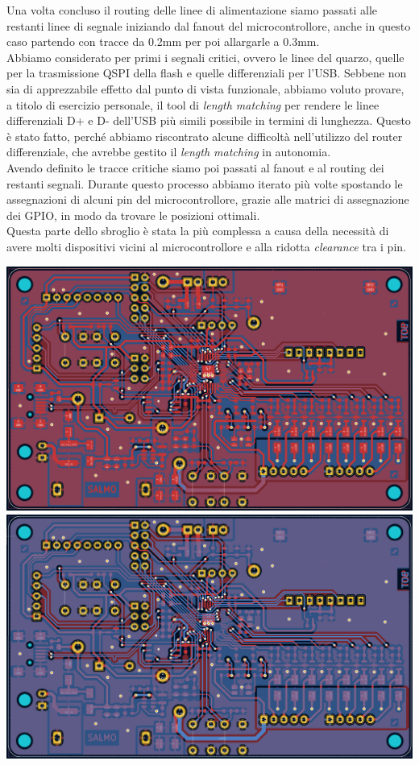 \noindent Una volta concluso il routing delle linee di alimentazione siamo passati
alle restanti linee di segnale iniziando dal fanout del
microcontrollore, anche in questo caso partendo con tracce da 0.2mm per
poi allargarle a 0.3mm.\\
Abbiamo considerato per primi i segnali critici, ovvero le linee del
quarzo, quelle per la trasmissione QSPI della flash e quelle
differenziali per l'USB. Sebbene non sia di apprezzabile effetto dal
punto di vista funzionale, abbiamo voluto provare, a titolo di esercizio
personale, il tool di \emph{length matching} per rendere le linee
differenziali D+ e D- dell'USB più simili possibile in termini di
lunghezza. Questo è stato fatto, perché abbiamo riscontrato alcune
difficoltà nell'utilizzo del router differenziale, che avrebbe gestito
il \emph{length matching} in autonomia.\\
Avendo definito le tracce critiche siamo poi passati al fanout e al
routing dei restanti segnali. Durante questo processo abbiamo iterato
più volte spostando le assegnazioni di alcuni pin del microcontrollore,
grazie alle matrici di assegnazione dei GPIO, in modo da trovare le
posizioni ottimali.\\
Questa parte dello sbroglio è stata la più complessa a causa della
necessità di avere molti dispositivi vicini al microcontrollore e alla
ridotta \emph{clearance} tra i pin.

\includegraphics[scale=0.16]{figures/image59.png}
\includegraphics[scale=0.16]{figures/image22.png}
\begin{center}
\captionsetup{type=figure}
\end{center}


